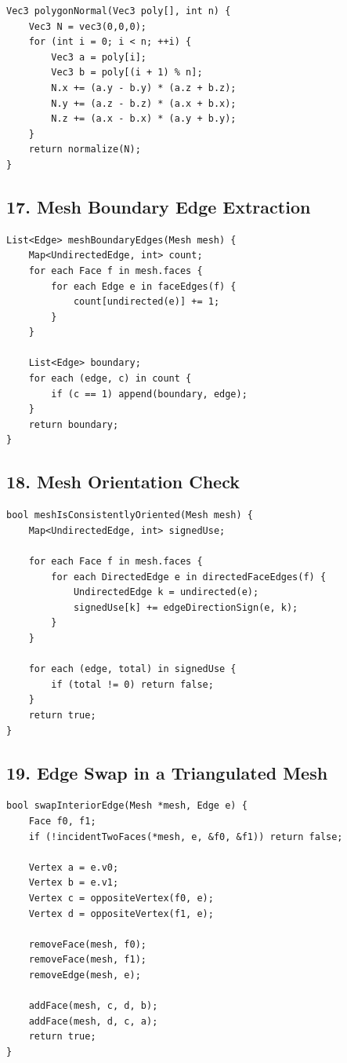 \documentclass[10pt,letterpaper]{article}
\begin{document}
\begin{verbatim}
Vec3 polygonNormal(Vec3 poly[], int n) {
    Vec3 N = vec3(0,0,0);
    for (int i = 0; i < n; ++i) {
        Vec3 a = poly[i];
        Vec3 b = poly[(i + 1) % n];
        N.x += (a.y - b.y) * (a.z + b.z);
        N.y += (a.z - b.z) * (a.x + b.x);
        N.z += (a.x - b.x) * (a.y + b.y);
    }
    return normalize(N);
}
\end{verbatim}

\subsection{17. Mesh Boundary Edge Extraction}

\begin{verbatim}
List<Edge> meshBoundaryEdges(Mesh mesh) {
    Map<UndirectedEdge, int> count;
    for each Face f in mesh.faces {
        for each Edge e in faceEdges(f) {
            count[undirected(e)] += 1;
        }
    }

    List<Edge> boundary;
    for each (edge, c) in count {
        if (c == 1) append(boundary, edge);
    }
    return boundary;
}
\end{verbatim}

\subsection{18. Mesh Orientation Check}

\begin{verbatim}
bool meshIsConsistentlyOriented(Mesh mesh) {
    Map<UndirectedEdge, int> signedUse;

    for each Face f in mesh.faces {
        for each DirectedEdge e in directedFaceEdges(f) {
            UndirectedEdge k = undirected(e);
            signedUse[k] += edgeDirectionSign(e, k);
        }
    }

    for each (edge, total) in signedUse {
        if (total != 0) return false;
    }
    return true;
}
\end{verbatim}

\subsection{19. Edge Swap in a Triangulated Mesh}

\begin{verbatim}
bool swapInteriorEdge(Mesh *mesh, Edge e) {
    Face f0, f1;
    if (!incidentTwoFaces(*mesh, e, &f0, &f1)) return false;

    Vertex a = e.v0;
    Vertex b = e.v1;
    Vertex c = oppositeVertex(f0, e);
    Vertex d = oppositeVertex(f1, e);

    removeFace(mesh, f0);
    removeFace(mesh, f1);
    removeEdge(mesh, e);

    addFace(mesh, c, d, b);
    addFace(mesh, d, c, a);
    return true;
}
\end{verbatim}
\end{document}
